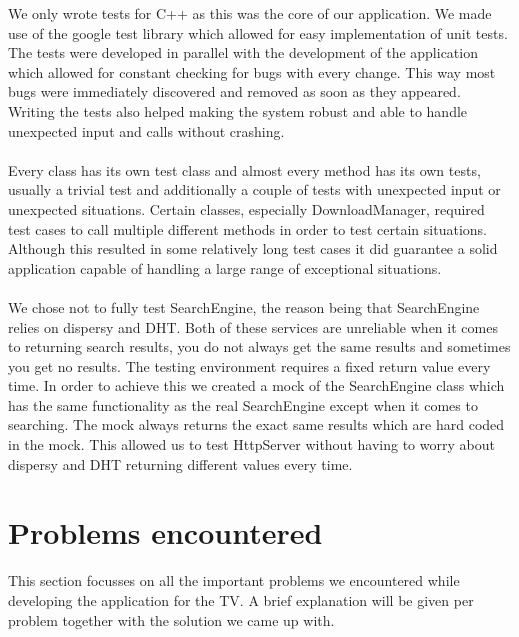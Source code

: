 We only wrote tests for C++ as this was the core of our application. We made use of the google test library which allowed for easy implementation of unit tests. The tests were developed in parallel with the development of the application which allowed for constant checking for bugs with every change. This way most bugs were immediately discovered and removed as soon as they appeared. Writing the tests also helped making the system robust and able to handle unexpected input and calls without crashing.
\\\\
Every class has its own test class and almost every method has its own tests, usually a trivial test and additionally a couple of tests with unexpected input or unexpected situations. Certain classes, especially DownloadManager, required test cases to call multiple different methods in order to test certain situations. Although this resulted in some relatively long test cases it did guarantee a solid application capable of handling a large range of exceptional situations.
\\\\
We chose not to fully test SearchEngine, the reason being that SearchEngine relies on dispersy and DHT. Both of these services are unreliable when it comes to returning search results, you do not always get the same results and sometimes you get no results. The testing environment requires a fixed return value every time. In order to achieve this we created a mock of the SearchEngine class which has the same functionality as the real SearchEngine except when it comes to searching. The mock always returns the exact same results which are hard coded in the mock. This allowed us to test HttpServer without having to worry about dispersy and DHT returning different values every time.

\section{Problems encountered}
This section focusses on all the important problems we encountered while developing the application for the TV. A brief explanation will be given per problem together with the solution we came up with.

